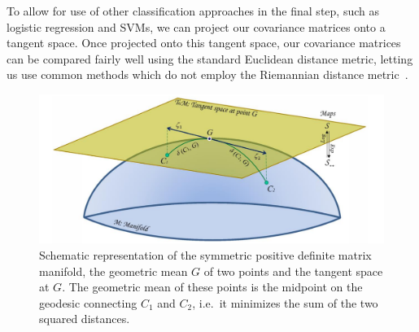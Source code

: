         To allow for use of other classification approaches in the final step, such as logistic regression and SVMs, we can project our covariance matrices onto a tangent space. Once projected onto this tangent space, our covariance matrices can be compared fairly well using the standard Euclidean distance metric, letting us use common methods which do not employ the Riemannian distance metric~\cite{congedo_riemannian_2017}.

        \begin{figure}[h]
            \centering
            \includegraphics[width=12cm]{img/riemannian-tangent-space.png}
            \caption{Schematic representation of the symmetric positive definite matrix manifold, the geometric mean $G$ of two points and the tangent space at $G$. The geometric mean of these points is the midpoint on the geodesic connecting $C_1$ and $C_2$, i.e.\ it minimizes the sum of the two squared distances.}\label{figure:tangent-space}
        \end{figure}

